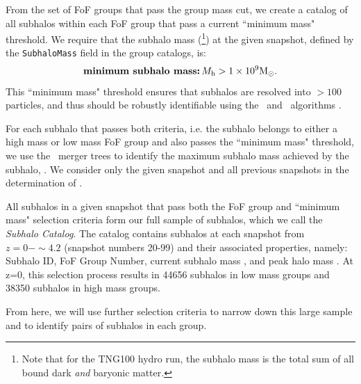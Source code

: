 \documentclass[twocolumn]{aastex631}
\newcommand{\subcat}{\textit{Subhalo Catalog}}
\begin{document}
    
    From the set of FoF groups that pass the group mass cut, we create a catalog of all subhalos within each FoF group that pass a current ``minimum mass" threshold.  
    We require that the subhalo mass (\Mhalo\footnote{Note that for the TNG100 hydro run, the subhalo mass is the total sum of all bound dark \textit{and} baryonic matter.}) at the given snapshot, defined by the \texttt{SubhaloMass} field in the group catalogs, is:
    \begin{equation*}
    \mbox{\textbf{minimum subhalo mass:}}\,
    \Mhalo > 1\times10^{9}\Msun.
    \end{equation*}
    This ``minimum mass" threshold ensures that subhalos are resolved into $>100$ particles, and thus should be robustly identifiable using the \subfind\ and \sublink\ algorithms \citep{rg15}. 

    For each subhalo that passes both criteria, i.e. the subhalo belongs to either a high mass or low mass FoF group and also passes the ``minimum mass" threshold, we use the \sublink\ merger trees to identify the maximum subhalo mass achieved by the subhalo, \Mpeak. 
    We consider only the given snapshot and all previous snapshots in the determination of \Mpeak.

    All subhalos in a given snapshot that pass both the FoF group and ``minimum mass" selection criteria form our full sample of subhalos, which we call the \subcat. 
    The catalog contains subhalos at each snapshot from $z=0-\sim4.2$ (snapshot numbers 20-99) and their associated properties, namely: Subhalo ID, FoF Group Number, current subhalo mass \Mhalo, and peak halo mass \Mpeak. 
    At z=0, this selection process results in 44656 subhalos in low mass groups and 38350 subhalos in high mass groups.   
    
    From here, we will use further selection criteria to narrow down this large sample and to identify pairs of subhalos in each group.
\end{document}
